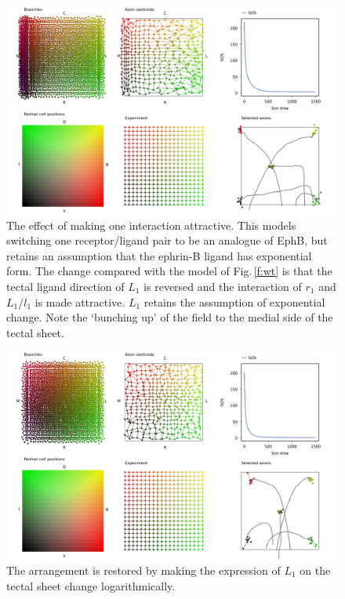\documentclass[11pt, a4paper]{article}
\begin{document}
\begin{figure}
\includegraphics[width=\linewidth]{./images/j4_ee_ephb_wt.png}
\caption{The effect of making one interaction attractive. This models
switching one receptor/ligand pair to be an analogue of EphB, but retains an
assumption that the ephrin-B ligand has exponential form. The change compared
with the model of Fig.\,\ref{f:wt} is that the tectal ligand direction of
$L_1$ is reversed and the interaction of $r_1$ and $L_1$/$l_1$ is made
attractive. $L_1$ retains the assumption of exponential change. Note the
`bunching up' of the field to the medial side of the tectal sheet.}
\label{f:ee_oneattractive}
\end{figure}

\begin{figure}
\includegraphics[width=\linewidth]{./images/j4_eel_ephb_wt.png}
\caption{The arrangement is restored by making the expression of $L_1$ on the
tectal sheet change logarithmically.}
\label{f:eel_oneattractive}
\end{figure}
\end{document}
